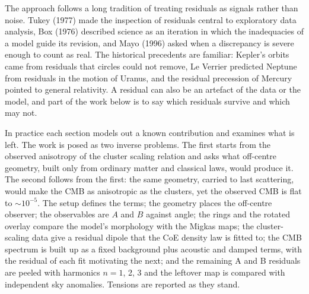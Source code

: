 \documentclass[10pt,twocolumn]{article}
\begin{document}
The approach follows a long tradition of treating residuals as signals rather than noise. Tukey (1977) made the inspection of residuals central to exploratory data analysis, Box (1976) described science as an iteration in which the inadequacies of a model guide its revision, and Mayo (1996) asked when a discrepancy is severe enough to count as real. The historical precedents are familiar: Kepler's orbits came from residuals that circles could not remove, Le Verrier predicted Neptune from residuals in the motion of Uranus, and the residual precession of Mercury pointed to general relativity. A residual can also be an artefact of the data or the model, and part of the work below is to say which residuals survive and which may not.

In practice each section models out a known contribution and examines what is left. The work is posed as two inverse problems. The first starts from the observed anisotropy of the cluster scaling relation and asks what off-centre geometry, built only from ordinary matter and classical laws, would produce it. The second follows from the first: the same geometry, carried to last scattering, would make the CMB as anisotropic as the clusters, yet the observed CMB is flat to $\sim10^{-5}$. The setup defines the terms; the geometry places the off-centre observer; the observables are $A$ and $B$ against angle; the rings and the rotated overlay compare the model's morphology with the Migkas maps; the cluster-scaling data give a residual dipole that the CoE density law is fitted to; the CMB spectrum is built up as a fixed background plus acoustic and damped terms, with the residual of each fit motivating the next; and the remaining A and B residuals are peeled with harmonics $n=1$, 2, 3 and the leftover map is compared with independent sky anomalies. Tensions are reported as they stand.
\end{document}
